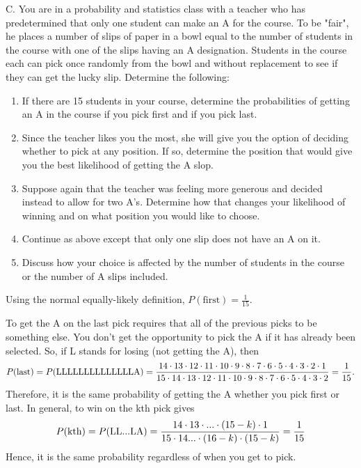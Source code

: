 \documentclass[10pt,]{book}
\theoremstyle{plain}
\theoremstyle{definition}
\theoremstyle{definition}
\theoremstyle{definition}
\numberwithin{equation}{section}
\begin{document}
	C. You are in a probability and statistics class with a teacher who has predetermined that only one student can make an A for the course. To be "fair", he places a number of slips of paper in a bowl equal to the number of students in the course with one of the slips having an A designation. Students in the course each can pick once randomly from the bowl and without replacement to see if they can get the lucky slip.  Determine the following:
	\leavevmode%
\begin{enumerate}
\item\hypertarget{li-120}{}If there are 15 students in your course, determine the probabilities of getting an A in the course if you pick first and if you pick last.%
\item\hypertarget{li-121}{}Since the teacher likes you the most, she will give you the option of deciding whether to pick at any position. If so, determine the position that would give you the best likelihood of getting the A slop.%
\item\hypertarget{li-122}{}Suppose again that the teacher was feeling more generous and decided instead to allow for two A's. Determine how that changes your likelihood of winning and on what position you would like to choose.%
\item\hypertarget{li-123}{}Continue as above except that only one slip does not have an A on it.%
\item\hypertarget{li-124}{}Discuss how your choice is affected by the number of students in the course or the number of A slips included.%
\end{enumerate}

	
	Using the normal equally-likely definition, \(P(\text{first}) = \frac{1}{15}\).
\par

	To get the A on the last pick requires that all of the previous picks to be something else. You don't get the opportunity to pick the A if it has already been selected. So, if L stands for losing (not getting the A), then 
	\begin{equation*} P(\text{last}) = P(\text{LLLLLLLLLLLLLLA}) \\ = \frac{14 \cdot 13 \cdot 12 \cdot 11 \cdot 10 \cdot 9  \cdot 8  \cdot 7  \cdot 6  \cdot 5  \cdot 4  \cdot 3  \cdot 2  \cdot 1}{15 \cdot 14 \cdot 13 \cdot 12 \cdot 11 \cdot 10 \cdot 9 \cdot 8 \cdot 7 \cdot 6 \cdot 5 \cdot 4 \cdot 3 \cdot 2} = \frac{1}{15}.\end{equation*}
	Therefore, it is the same probability of getting the A whether you pick first or last.  In general, to win on the kth pick gives
	\begin{equation*} P(\text{kth}) = P(\text{LL...LA}) \\ = \frac{14 \cdot 13 \cdot ... \cdot (15-k)  \cdot 1}{15 \cdot 14 ... \cdot (16-k) \cdot (15-k)} = \frac{1}{15}\end{equation*}
	Hence, it is the same probability regardless of when you get to pick.
\par
\end{document}
